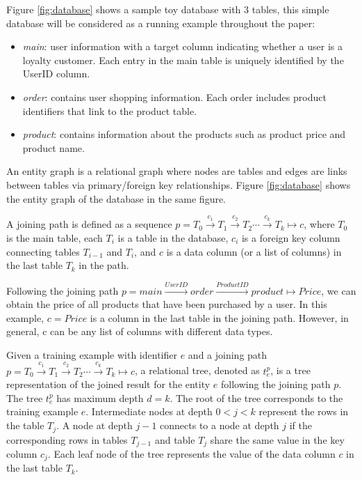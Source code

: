 \begin{example}
Figure \ref{fig:database} shows a sample toy database with 3 tables, this simple database will be considered as a running example throughout the paper:
\begin{itemize}
\item  \textit{main}: user information with a target column indicating whether a user is a loyalty customer. Each entry in the main table is uniquely identified by the UserID column. 
\item  \textit{order}: contains user shopping information. Each order includes product identifiers that link to the product table.
\item  \textit{product}: contains information about the products such as product price and product name.
\end{itemize}
\end{example}

An entity graph is a relational graph where nodes are tables and edges are links between tables via primary/foreign key relationships. Figure \ref{fig:database} shows the entity graph of the database in the same figure.

\begin{definition} 
A joining path is defined as a sequence $p = T_0 \xrightarrow{c_1} T_1 \xrightarrow{c_2} T_2 \cdots \xrightarrow{c_k} T_k \mapsto c$, where $T_0$ is the main table, each $T_i$ is a table in the database, $c_i$ is a foreign key column connecting tables $T_{i-1}$ and $T_i$, and $c$ is a data column (or a list of columns) in the last table $T_k$ in the path.
\end{definition}


\begin{example}
Following the joining path $p = main \xrightarrow {UserID} order \xrightarrow {ProductID} product \mapsto Price$, we can obtain the price of all products that have been purchased by a user. In this example, $c =  Price$ is a column in the last table in the joining path. However, in general, c can be any list of columns with different data types.
\end{example}




\begin{definition} 
Given a training example with identifier $e$ and a joining path  $p = T_0 \xrightarrow{c_1} T_1 \xrightarrow{c_2} T_2 \cdots \xrightarrow{c_k} T_k \mapsto c$, a relational tree, denoted as $t^p_e$, is a tree representation of the joined result for the entity $e$ following the joining path $p$. The tree  $t^p_e$ has maximum depth $d = k$. The root of the tree corresponds to the training example $e$. Intermediate nodes at depth $0 < j < k$ represent the rows in the table $T_j$. A node at depth $j-1$  connects to a node at depth $j$ if the corresponding rows in tables $T_{j-1}$ and table $T_j$ share the same value in the key column $c_j$. Each leaf node of the tree represents the value of the data column $c$ in the last table $T_k$.
\end{definition}

